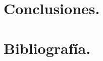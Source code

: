 \documentclass{beamer}
\begin{document}
  \section{Conclusiones.}
  \begin{frame}
    
  \end{frame}
  \section{Bibliografía.}
  \begin{thebibliography}{00}
    \bibitem{}
    
  \end{thebibliography}

\end{document}
